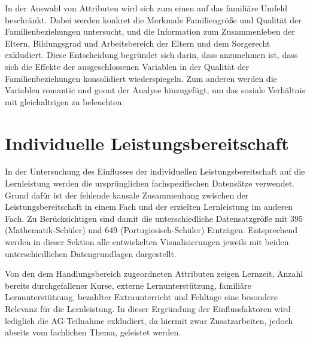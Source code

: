 In der Auswahl von Attributen wird sich zum einen auf das familiäre Umfeld beschränkt. 
Dabei werden konkret die Merkmale Familiengröße und Qualität der Familienbeziehungen untersucht, und die Information zum Zusammenleben der Eltern, Bildungsgrad und Arbeitsbereich der Eltern und dem Sorgerecht exkludiert.
Diese Entscheidung begründet sich darin, dass anzunehmen ist, dass sich die Effekte der ausgeschlossenen Variablen in der Qualität der Familienbeziehungen konsolidiert wiederspiegeln.
Zum anderen werden die Variablen romantic und goout der Analyse hinzugefügt, um das soziale Verhältnis mit gleichaltrigen zu beleuchten.

\section{Individuelle Leistungsbereitschaft}

In der Untersuchung des Einflusses der individuellen Leistungsbereitschaft auf die Lernleistung werden die ursprünglichen fachspezifischen Datensätze verwendet.
Grund dafür ist der fehlende kausale Zusammenhang zwischen der Leistungsbereitschaft in einem Fach und der erzielten Lernleistung im anderen Fach.
Zu Berücksichtigen sind damit die unterschiedliche Datensatzgröße mit 395 (Mathematik-Schüler) und 649 (Portugiesisch-Schüler) Einträgen.
Entsprechend werden in dieser Sektion alle entwickelten Visualisierungen jeweils mit beiden unterschiedlichen Datengrundlagen dargestellt.

Von den dem Handlungsbereich zugeordneten Attributen zeigen Lernzeit, Anzahl bereits durchgefallener Kurse, externe Lernunterstützung, familiäre Lernunterstützung, bezahlter Extraunterricht und Fehltage eine besondere Relevanz für die Lernleistung. 
In dieser Ergründung der Einflussfaktoren wird lediglich die AG-Teilnahme exkludiert, da hiermit zwar Zusatzarbeiten, jedoch abseits vom fachlichen Thema, geleistet werden.

    
